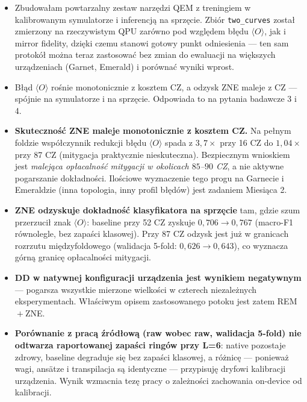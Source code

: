 \documentclass[11pt,a4paper]{article}
\begin{document}
\begin{itemize}
\item Zbudowałam powtarzalny zestaw narzędzi QEM z treningiem w kalibrowanym symulatorze
      i inferencją na sprzęcie. Zbiór \texttt{two\_curves} został zmierzony na rzeczywistym
      QPU zarówno pod względem błędu $\langle O\rangle$, jak i mirror fidelity, dzięki czemu
      stanowi gotowy punkt odniesienia --- ten sam protokół można teraz zastosować bez zmian
      do ewaluacji na większych urządzeniach (Garnet, Emerald) i porównać wyniki wprost.
\item Błąd $\langle O\rangle$ rośnie monotonicznie z kosztem CZ, a odzysk ZNE maleje z CZ ---
      spójnie na symulatorze i na sprzęcie. Odpowiada to na pytania badawcze 3 i 4.
\item \textbf{Skuteczność ZNE maleje monotonicznie z kosztem CZ.} Na pełnym foldzie
      współczynnik redukcji błędu $\langle O\rangle$ spada z $3{,}7\times$ przy 16 CZ do
      $1{,}04\times$ przy 87 CZ (mitygacja praktycznie nieskuteczna). Bezpiecznym wnioskiem
      jest \emph{malejąca opłacalność mitygacji w okolicach $85$--$90$ CZ}, a nie aktywne
      pogarszanie dokładności. Ilościowe wyznaczenie tego progu na
      Garnecie i Emeraldzie (inna topologia, inny profil błędów) jest zadaniem Miesiąca 2.
\item \textbf{ZNE odzyskuje dokładność klasyfikatora na sprzęcie} tam, gdzie szum przerzucił
      znak $\langle O\rangle$: baseline przy 52 CZ zyskuje $0{,}706\to0{,}767$ (macro-F1
      równolegle, bez zapaści klasowej). Przy 87 CZ odzysk jest już w granicach rozrzutu
      międzyfoldowego (walidacja 5-fold: $0{,}626\to0{,}643$), co wyznacza górną granicę
      opłacalności mitygacji.
\item \textbf{DD w natywnej konfiguracji urządzenia jest wynikiem negatywnym} ---
      pogarsza wszystkie mierzone wielkości w czterech niezależnych eksperymentach.
      Właściwym opisem zastosowanego potoku jest zatem REM${}+{}$ZNE.
\item \textbf{Porównanie z pracą źródłową (raw wobec raw, walidacja 5-fold) nie odtwarza
      raportowanej zapaści ringów przy L=6}: native pozostaje zdrowy, baseline degraduje się
      bez zapaści klasowej, a różnicę --- ponieważ wagi, ansätze i transpilacja są identyczne ---
      przypisuję dryfowi kalibracji urządzenia. Wynik wzmacnia tezę pracy o zależności zachowania
      on-device od kalibracji.
\end{itemize}

\end{document}
